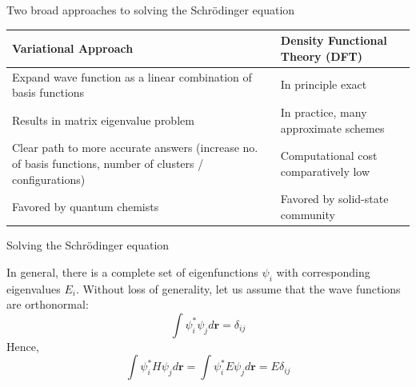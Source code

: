 \documentclass[aspectratio=169]{beamer}
\let \vec \mathbf
\begin{document}
    \begin{frame}{Two broad approaches to solving the Schr\"odinger equation}

        \begin{table}[]
            \centering
            \begin{tabular}{p{7cm}|p{7cm}}
                \textbf{Variational Approach}                                                                              & \textbf{Density Functional Theory (DFT)} \\
                \hline\hline
                Expand wave function as a linear combination of basis functions                                            & In principle exact                       \\
                \hline
                Results in matrix eigenvalue problem                                                                       & In practice, many approximate schemes    \\
                \hline
                Clear path to more accurate answers (increase no. of basis functions, number of clusters / configurations) & Computational cost comparatively low\\
                \hline
                Favored by quantum chemists                                                                                & Favored by solid-state community         \\
            \end{tabular}
        \end{table}

    \end{frame}

    \begin{frame}{Solving the Schr\"odinger equation}

        In general, there is a complete set of eigenfunctions $\psi_i$ with corresponding eigenvalues $E_i$. Without loss of generality, let us assume that the wave functions are orthonormal:
        \begin{equation*}
            \int \psi_i^*\psi_j d\vec{r} = \delta_{ij}
        \end{equation*}
        Hence,
        \begin{equation*}
            \int \psi_i^*H\psi_j d\vec{r} = \int \psi_i^*E\psi_j d\vec{r}=E\delta_{ij}
        \end{equation*}
    \end{frame}
\end{document}
